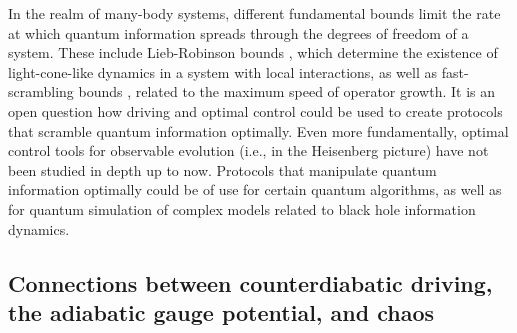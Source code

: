 In the realm of many-body systems, different fundamental bounds limit the rate at which quantum information spreads through the degrees of freedom of a system. These include Lieb-Robinson bounds \cite{chen2023}, which determine the existence of light-cone-like dynamics in a system with local interactions, as well as fast-scrambling bounds \cite{lashkari2013}, related to the maximum speed of operator growth. It is an open question how driving and optimal control could be used to create protocols that scramble quantum information optimally. Even more fundamentally, optimal control tools for observable evolution (i.e., in the Heisenberg picture) have not been studied in depth up to now.  Protocols that manipulate quantum information optimally could be of use for certain quantum algorithms, as well as for quantum simulation of complex models related to black hole information dynamics.

\subsection{Connections between counterdiabatic driving, the adiabatic gauge potential, and chaos}


